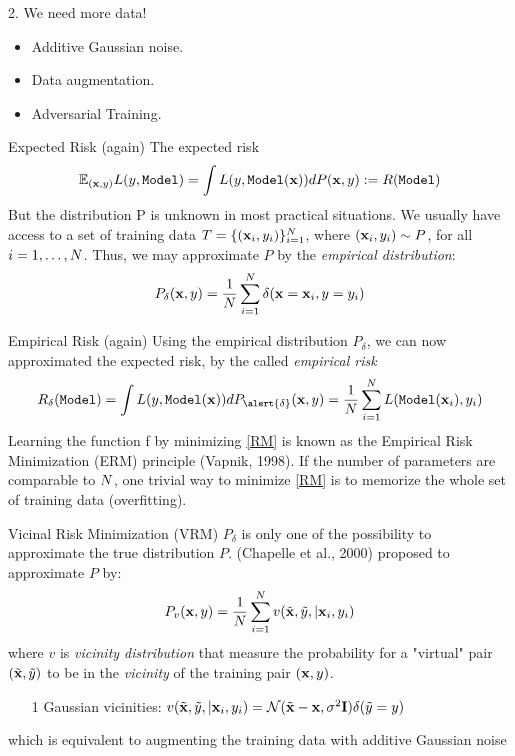 \documentclass[xcolor=pdftex,dvipsnames,table,mathserif]{beamer}
\begin{document}
\begin{frame}{2. We need more data!}
\begin{itemize}
\item Additive Gaussian noise.
\item Data augmentation.
\item Adversarial Training.
\end{itemize}
\end{frame}

\begin{frame}{Expected Risk (again)}
The expected risk
\begin{equation*}
 \mathbb{E}_{(\mathbf{x},y)}  L(y,\texttt{Model}) =  \int L(y,\texttt{Model} (\mathbf{x})) dP(\mathbf{x},y) := R(\texttt{Model} )
\end{equation*}
\pause
But the distribution P is \alert{unknown} in most practical situations. 
\pause
We usually have access to a set of training data $T=\{(\mathbf{x}_i,y_i) \}_{i=1}^{N}$, where $(\mathbf{x}_i,y_i)\sim P$, for all $i=1,\ldots,N$. Thus, we may approximate $P$ by the \emph{empirical distribution}:
\begin{equation*}
P_{\delta}(\mathbf{x},y) = \frac{1}{N}\sum_{i=1}^{N}\delta(\mathbf{x}=\mathbf{x}_i,y=y_i)
\end{equation*}
\end{frame}

\begin{frame}{Empirical Risk (again)}
Using the empirical distribution $P_{\delta}$, we can now approximated the expected risk, by the called \emph{empirical risk}
\begin{equation}\label{RM}
R_{\delta}(\texttt{Model} ) = \int \loss(y,\texttt{Model} (\x)) dP_{\alert{\delta}}(\x,y) = \frac{1}{\nsize}\sum_{i=1}^{\nsize}\loss(\texttt{Model}(\x_i),y_i)
\end{equation}
Learning the function f by minimizing \eqref{RM} is known as the Empirical Risk Minimization (ERM) principle \cite{vapnik98} (Vapnik, 1998). If the number of parameters are comparable to $N$, one trivial way to minimize \eqref{RM} is to \alert{memorize} the whole set of training data (overfitting).
\end{frame}

\begin{frame}{Vicinal Risk Minimization (VRM)}
$P_{\delta}$ is only one of the possibility to approximate the true distribution $P$. (Chapelle et al., 2000) proposed to approximate $P$ by:
\begin{equation*}
P_{v}(\mathbf{x},y) = \frac{1}{N}\sum_{i=1}^{N}v(\tilde{\mathbf{x}},\tilde{y}, |\mathbf{x}_i,y_i)
\end{equation*}
where $v$ is \emph{vicinity distribution} that measure the probability for a "virtual" pair $(\tilde{\mathbf{x}},\tilde{y})$ to be in the \emph{vicinity} of the training pair $(\mathbf{x},y)$. \pause
\begin{enumerate}
\item[1]  Gaussian vicinities: $v(\tilde{\mathbf{x}},\tilde{y}, |\mathbf{x}_i,y_i)=\mathcal{N}(\tilde{\mathbf{x}}-\mathbf{x},\sigma^2\mathbf{I})\delta(\tilde{y}=y)$
\end{enumerate}
\pause
\alert{which is equivalent to augmenting the training data with additive Gaussian noise}
\end{frame}
\end{document}
